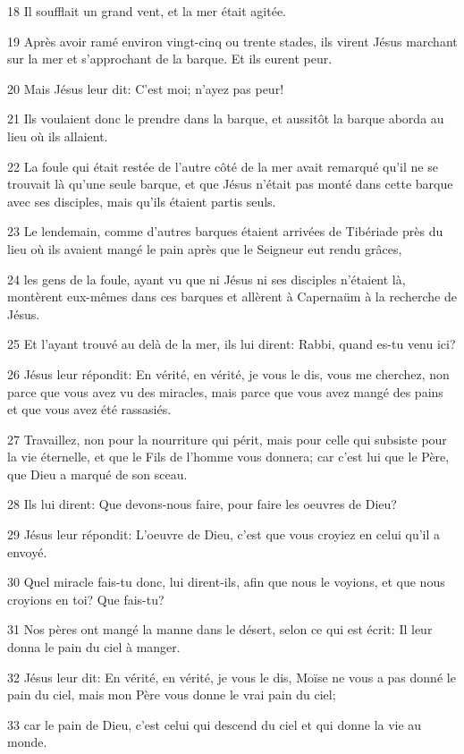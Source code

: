 \par 18 Il soufflait un grand vent, et la mer était agitée.
\par 19 Après avoir ramé environ vingt-cinq ou trente stades, ils virent Jésus marchant sur la mer et s'approchant de la barque. Et ils eurent peur.
\par 20 Mais Jésus leur dit: C'est moi; n'ayez pas peur!
\par 21 Ils voulaient donc le prendre dans la barque, et aussitôt la barque aborda au lieu où ils allaient.
\par 22 La foule qui était restée de l'autre côté de la mer avait remarqué qu'il ne se trouvait là qu'une seule barque, et que Jésus n'était pas monté dans cette barque avec ses disciples, mais qu'ils étaient partis seuls.
\par 23 Le lendemain, comme d'autres barques étaient arrivées de Tibériade près du lieu où ils avaient mangé le pain après que le Seigneur eut rendu grâces,
\par 24 les gens de la foule, ayant vu que ni Jésus ni ses disciples n'étaient là, montèrent eux-mêmes dans ces barques et allèrent à Capernaüm à la recherche de Jésus.
\par 25 Et l'ayant trouvé au delà de la mer, ils lui dirent: Rabbi, quand es-tu venu ici?
\par 26 Jésus leur répondit: En vérité, en vérité, je vous le dis, vous me cherchez, non parce que vous avez vu des miracles, mais parce que vous avez mangé des pains et que vous avez été rassasiés.
\par 27 Travaillez, non pour la nourriture qui périt, mais pour celle qui subsiste pour la vie éternelle, et que le Fils de l'homme vous donnera; car c'est lui que le Père, que Dieu a marqué de son sceau.
\par 28 Ils lui dirent: Que devons-nous faire, pour faire les oeuvres de Dieu?
\par 29 Jésus leur répondit: L'oeuvre de Dieu, c'est que vous croyiez en celui qu'il a envoyé.
\par 30 Quel miracle fais-tu donc, lui dirent-ils, afin que nous le voyions, et que nous croyions en toi? Que fais-tu?
\par 31 Nos pères ont mangé la manne dans le désert, selon ce qui est écrit: Il leur donna le pain du ciel à manger.
\par 32 Jésus leur dit: En vérité, en vérité, je vous le dis, Moïse ne vous a pas donné le pain du ciel, mais mon Père vous donne le vrai pain du ciel;
\par 33 car le pain de Dieu, c'est celui qui descend du ciel et qui donne la vie au monde.
